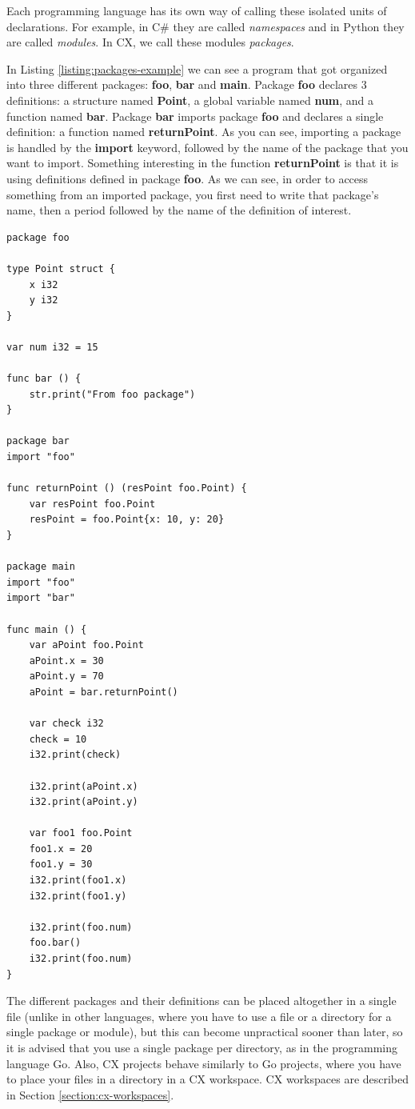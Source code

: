 \documentclass[11pt,fleqn,openany]{book} %
\begin{document}
Each programming language has its own way of calling these isolated units of declarations. For example, in C\# they are called \emph{namespaces} and in Python they are called \emph{modules}. In  CX, we call these modules \emph{packages}.

In Listing \ref{listing:packages-example} we can see a program that got organized into three different packages: \textbf{foo}, \textbf{bar} and \textbf{main}. Package \textbf{foo} declares 3 definitions: a structure named \textbf{Point}, a global variable named \textbf{num}, and a function named \textbf{bar}. Package \textbf{bar} imports package \textbf{foo} and declares a single definition: a function named \textbf{returnPoint}. As you can see, importing a package is handled by the \textbf{import} keyword, followed by the name of the package that you want to import. Something interesting in the function \textbf{returnPoint} is that it is using definitions defined in package \textbf{foo}. As we can see, in order to access something from an imported package, you first need to write that package's name, then a period followed by the name of the definition of interest.

\begin{lstlisting}[caption={Importing Packages Example},captionpos=b,label={listing:packages-example}]
package foo

type Point struct {
	x i32
	y i32
}

var num i32 = 15

func bar () {
	str.print("From foo package")
}

package bar
import "foo"

func returnPoint () (resPoint foo.Point) {
	var resPoint foo.Point
	resPoint = foo.Point{x: 10, y: 20}
}

package main
import "foo"
import "bar"

func main () {
	var aPoint foo.Point
	aPoint.x = 30
	aPoint.y = 70
	aPoint = bar.returnPoint()

	var check i32
	check = 10
	i32.print(check)
	
	i32.print(aPoint.x)
	i32.print(aPoint.y)

	var foo1 foo.Point
	foo1.x = 20
	foo1.y = 30
	i32.print(foo1.x)
	i32.print(foo1.y)
	
	i32.print(foo.num)
	foo.bar()
	i32.print(foo.num)
}
\end{lstlisting}

The different packages and their definitions can be placed altogether in a single file (unlike in other languages, where you have to use a file or a directory for a single package or module), but this can become unpractical sooner than later, so it is advised that you use a single package per directory, as in the programming language Go. Also, CX projects behave similarly to Go projects, where you have to place your files in a directory in a CX workspace. CX workspaces are described in Section \ref{section:cx-workspaces}.
\end{document}
